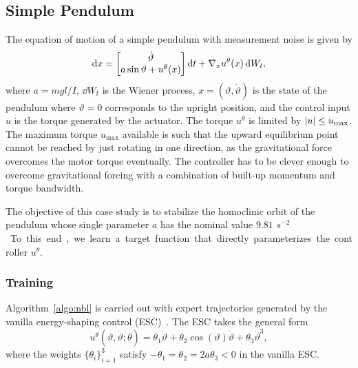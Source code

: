

\subsection{Simple Pendulum}

The equation of motion of a simple pendulum with measurement noise is given by
%
\begin{equation}
    \operatorname{d}\! x = \begin{bmatrix}
        \dot{\vartheta} \\ 
        a \sin{\vartheta} + u^\theta(x)
    \end{bmatrix} \operatorname{d}\! t+ \nabla_x u^\theta(x) \operatorname{d}\! W_t,
    \label{eq:pendulum_sde}
\end{equation}
%
where $a=mgl/I$, $\dd W_t$ is the Wiener process, $x = (\vartheta,
\dot{\vartheta})$ is the state of the pendulum where $\vartheta = 0$ corresponds
to the upright position, and the control input $u$ is the torque generated by
the actuator. 
%
The torque \(u^\theta\) is limited by \(\left|{u}\right| \leq u_{\textrm{max}}\).
%
The maximum torque $u_{\textrm{max}}$ available is such that the upward
equilibrium point cannot be reached by just rotating in one direction, as the
gravitational force overcomes the motor torque eventually. The controller has to
be clever enough to overcome gravitational forcing with a combination of
built-up momentum and torque bandwidth.

The objective of this case study is to stabilize the homoclinic orbit of the
pendulum whose single parameter $a$ has the nominal value $9.81$
\unit{$s^{-2}$}. To this end, we learn a target function that directly
parameterizes the controller $u^\theta$.

\subsubsection{Training} 
Algorithm~\ref{algo:nbl} is carried out with expert
trajectories generated by the vanilla energy-shaping control
(ESC)~\cite{underactuated}. The ESC takes the general form
%
\begin{equation}
    u^\theta(\vartheta, \dot{\vartheta}; \theta) = \theta_1 \dot{\vartheta} + \theta_2 \cos{(\vartheta)} \dot{\vartheta} + \theta_3 \dot{\vartheta}^3,
    \label{eq:pendulum_esc}
\end{equation}
%
where the weights $\{\theta_i\}_{i=1}^3$ satisfy $-\theta_1 = \theta_2 = 2a
\theta_3 < 0$ in the vanilla ESC. 

